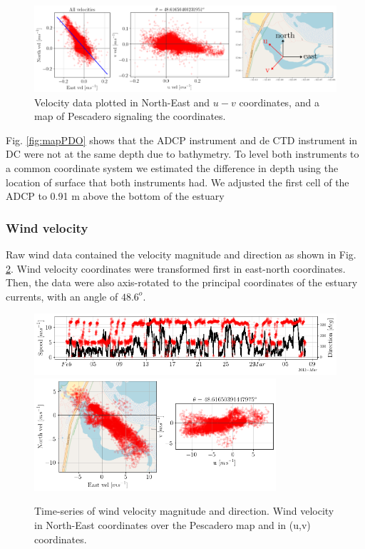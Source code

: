 \documentclass[tesis.tex]{subfiles}
\begin{document}
\begin{figure}[h!]
    \centering
    \includegraphics[width=\textwidth]{Imagenes/rotacion.png}
    \caption{Velocity data plotted in North-East and $u-v$ coordinates, and a map of Pescadero signaling the coordinates.}
    \label{fig:rotacion}
\end{figure}

Fig. \ref{fig:mapPDO} shows that the ADCP instrument and de CTD instrument in DC were not at the same depth due to bathymetry. To level both instruments to a common coordinate system we estimated the difference in depth using the location of surface that both instruments had. We adjusted the first cell of the ADCP to 0.91 m above the bottom of the estuary

\subsubsection{Wind velocity}

Raw wind data contained the velocity magnitude and direction as shown in Fig. \ref{fig:wind_raw}. Wind velocity coordinates were transformed first in east-north coordinates. Then, the data were also axis-rotated to the principal coordinates of the estuary currents, with an angle of $48.6^o$.

\begin{figure}[h!]
    \centering
    \includegraphics[width=\textwidth]{Imagenes/wind_raw.png}
    \includegraphics[width=0.8\textwidth]{Imagenes/wind_rotation.png}
    \caption{Time-series of wind velocity magnitude and direction. Wind velocity in North-East coordinates over the Pescadero map and in (u,v) coordinates.}
    \label{fig:wind_raw}
\end{figure}
\end{document}
